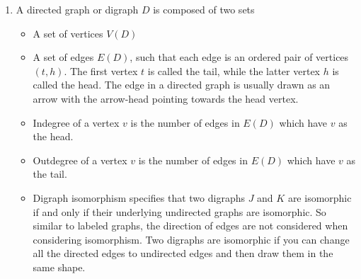 \documentclass[14pt]{article}
\begin{document}
\begin{enumerate}
\item A directed graph or digraph $D$ is composed of two sets
 \begin{itemize}
  \item A set of vertices $V(D)$
  \item A set of edges $E(D)$, such that each edge is an ordered pair of vertices $(t,h)$. The first vertex $t$ is called the tail, while the latter vertex $h$ is called the head. The edge in a directed graph is usually drawn as an arrow with the arrow-head pointing towards the head vertex. 
  \item Indegree of a vertex $v$ is the number of edges in $E(D)$ which have $v$ as the head.
  \item Outdegree of a vertex $v$ is the number of edges in $E(D)$ which have $v$ as the tail.
  \item Digraph isomorphism specifies that two digraphs $J$ and $K$ are isomorphic if and only if their underlying undirected graphs are isomorphic. So similar to labeled graphs, the direction of edges are not considered when considering isomorphism. Two digraphs are isomorphic if you can change all the directed edges to undirected edges and then draw them in the same shape. 
 \end{itemize}
 

\end{enumerate}
\end{document}
